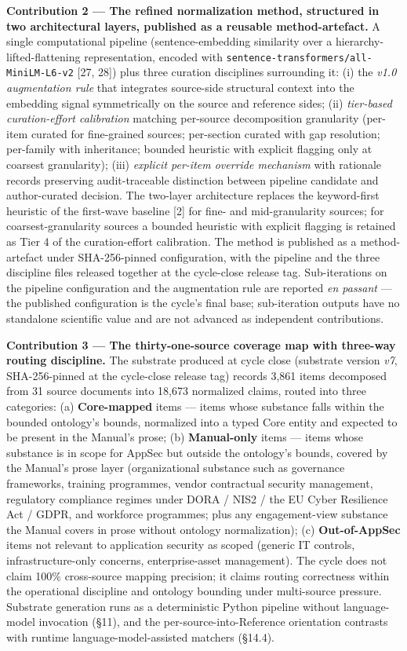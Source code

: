 \documentclass[
]{article}
\begin{document}
\textbf{Contribution 2 --- The refined normalization method, structured
in two architectural layers, published as a reusable method-artefact.} A
single computational pipeline (sentence-embedding similarity over a
hierarchy-lifted-flattening representation, encoded with
\texttt{sentence-transformers/all-MiniLM-L6-v2} {[}27, 28{]}) plus three
curation disciplines surrounding it: (i) the \emph{v1.0 augmentation
rule} that integrates source-side structural context into the embedding
signal symmetrically on the source and reference sides; (ii)
\emph{tier-based curation-effort calibration} matching per-source
decomposition granularity (per-item curated for fine-grained sources;
per-section curated with gap resolution; per-family with inheritance;
bounded heuristic with explicit flagging only at coarsest granularity);
(iii) \emph{explicit per-item override mechanism} with rationale records
preserving audit-traceable distinction between pipeline candidate and
author-curated decision. The two-layer architecture replaces the
keyword-first heuristic of the first-wave baseline {[}2{]} for fine- and
mid-granularity sources; for coarsest-granularity sources a bounded
heuristic with explicit flagging is retained as Tier 4 of the
curation-effort calibration. The method is published as a
method-artefact under SHA-256-pinned configuration, with the pipeline
and the three discipline files released together at the cycle-close
release tag. Sub-iterations on the pipeline configuration and the
augmentation rule are reported \emph{en passant} --- the published
configuration is the cycle's final base; sub-iteration outputs have no
standalone scientific value and are not advanced as independent
contributions.

\textbf{Contribution 3 --- The thirty-one-source coverage map with
three-way routing discipline.} The substrate produced at cycle close
(substrate version \emph{v7}, SHA-256-pinned at the cycle-close release
tag) records 3,861 items decomposed from 31 source documents into 18,673
normalized claims, routed into three categories: (a)
\textbf{Core-mapped} items --- items whose substance falls within the
bounded ontology's bounds, normalized into a typed Core entity and
expected to be present in the Manual's prose; (b) \textbf{Manual-only}
items --- items whose substance is in scope for AppSec but outside the
ontology's bounds, covered by the Manual's prose layer (organizational
substance such as governance frameworks, training programmes, vendor
contractual security management, regulatory compliance regimes under
DORA / NIS2 / the EU Cyber Resilience Act / GDPR, and workforce
programmes; plus any engagement-view substance the Manual covers in
prose without ontology normalization); (c) \textbf{Out-of-AppSec} items
not relevant to application security as scoped (generic IT controls,
infrastructure-only concerns, enterprise-asset management). The cycle
does not claim 100\% cross-source mapping precision; it claims routing
correctness within the operational discipline and ontology bounding
under multi-source pressure. Substrate generation runs as a
deterministic Python pipeline without language-model invocation (§11),
and the per-source-into-Reference orientation contrasts with runtime
language-model-assisted matchers (§14.4).
\end{document}
